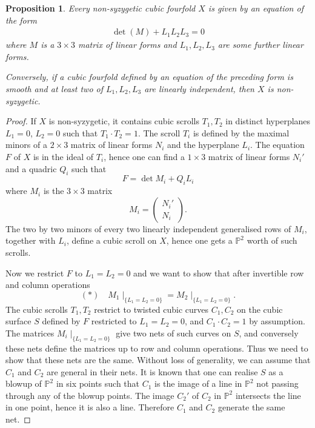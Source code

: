 \documentclass[11pt]{amsart}
\theoremstyle{plain}
\newtheorem{proposition}[theorem]{Proposition}
\numberwithin{equation}{section}
\theoremstyle{definition}
\theoremstyle{remark}
\begin{document}
\begin{proposition}\label{pNonsyzygetic}
Every non-syzygetic cubic fourfold $X$ is given by an equation of the form 
\begin{gather}\label{fNonsyzEquation}
 \det (M) + L_1L_2L_3 =0
\end{gather}
where $M$ is a $3\times 3$ matrix of linear forms and $L_1, L_2, L_3$ are some further linear forms.

Conversely, if a cubic fourfold defined by an equation of the preceding form is smooth and at least two of  $L_1, L_2, L_3$ are linearly independent, then $X$ is non-syzygetic. 
\end{proposition}

\begin{proof}
If $X$ is non-syzygetic, it contains cubic scrolls $T_1, T_2$ in distinct hyperplanes $L_1=0$, $L_2=0$ such that $T_1\cdot T_2=1$. The scroll $T_i$ is defined by the maximal minors of a $2\times 3$ matrix of linear forms $N_i$ and the hyperplane $L_i$. The equation $F$ of $X$ is in the ideal of $T_i$, hence one can find a $1\times 3$ matrix of linear forms $N_i'$ and a quadric $Q_i$ such that 
\[
F = \det M_i + Q_i L_i
\]
where $M_i$ is the $3\times 3$ matrix 
\[
M_i =\begin{pmatrix} N_i'\\ N_i \end{pmatrix}.
\]
The two by two minors of every two linearly independent generalised rows of $M_i$, together with $L_i$, define a cubic scroll on $X$, hence one gets a $\mathbb{P}^2$ worth of such scrolls. 

\medskip

Now we restrict $F$ to $L_1=L_2=0$ and we want to show that after invertible row and column operations 
\[
(\ast) \quad M_1\mid_{\{L_1=L_2=0\}} = M_2\mid_{\{L_1=L_2=0\}}. 
\]
The cubic scrolls $T_1, T_2$ restrict to twisted cubic curves $C_1, C_2$ on the cubic surface $S$ defined by $F$ restricted to $L_1=L_2=0$, and $C_1\cdot C_2=1$ by assumption. The matrices $M_i\mid_{\{L_1=L_2=0\}}$ give two nets of such curves on $S$, and conversely these nets define the matrices up to row and column operations. Thus we need to show that these nets are the same. Without loss of generality, we can assume that $C_1$ and $C_2$ are general in their nets. It is known that one can realise $S$ as a blowup of $\mathbb{P}^2$ in six points such that $C_1$ is the image of a line in $\mathbb{P}^2$ not passing through any of the blowup points. The image $C_2'$ of $C_2$ in $\mathbb{P}^2$ intersects the line in one point, hence it is also a line. Therefore $C_1$ and $C_2$ generate the same net. 


\end{proof}
\end{document}
